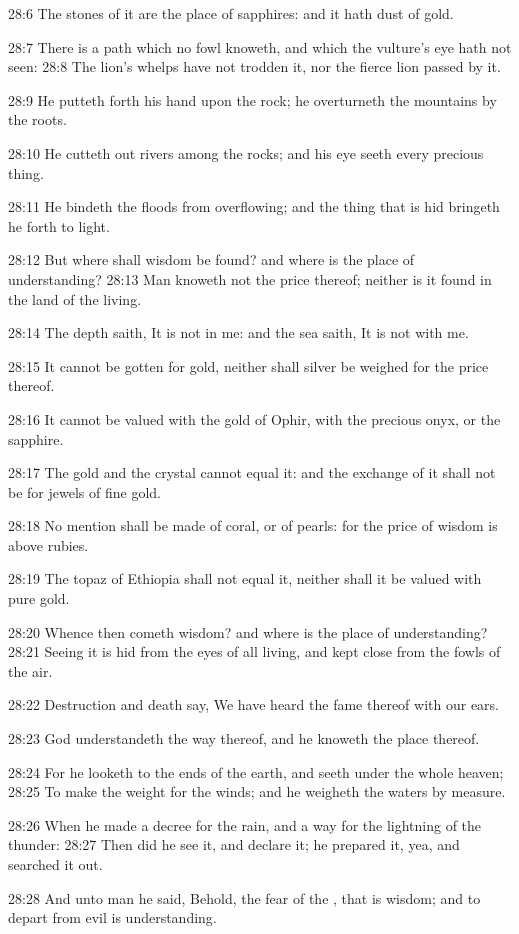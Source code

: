 28:6 The stones of it are the place of sapphires: and it hath dust of
gold.

28:7 There is a path which no fowl knoweth, and which the vulture's
eye hath not seen: 28:8 The lion's whelps have not trodden it, nor the
fierce lion passed by it.

28:9 He putteth forth his hand upon the rock; he overturneth the
mountains by the roots.

28:10 He cutteth out rivers among the rocks; and his eye seeth every
precious thing.

28:11 He bindeth the floods from overflowing; and the thing that is
hid bringeth he forth to light.

28:12 But where shall wisdom be found? and where is the place of
understanding?  28:13 Man knoweth not the price thereof; neither is it
found in the land of the living.

28:14 The depth saith, It is not in me: and the sea saith, It is not
with me.

28:15 It cannot be gotten for gold, neither shall silver be weighed
for the price thereof.

28:16 It cannot be valued with the gold of Ophir, with the precious
onyx, or the sapphire.

28:17 The gold and the crystal cannot equal it: and the exchange of it
shall not be for jewels of fine gold.

28:18 No mention shall be made of coral, or of pearls: for the price
of wisdom is above rubies.

28:19 The topaz of Ethiopia shall not equal it, neither shall it be
valued with pure gold.

28:20 Whence then cometh wisdom? and where is the place of
understanding?  28:21 Seeing it is hid from the eyes of all living,
and kept close from the fowls of the air.

28:22 Destruction and death say, We have heard the fame thereof with
our ears.

28:23 God understandeth the way thereof, and he knoweth the place
thereof.

28:24 For he looketh to the ends of the earth, and seeth under the
whole heaven; 28:25 To make the weight for the winds; and he weigheth
the waters by measure.

28:26 When he made a decree for the rain, and a way for the lightning
of the thunder: 28:27 Then did he see it, and declare it; he prepared
it, yea, and searched it out.

28:28 And unto man he said, Behold, the fear of the \LORD, that is
wisdom; and to depart from evil is understanding.

